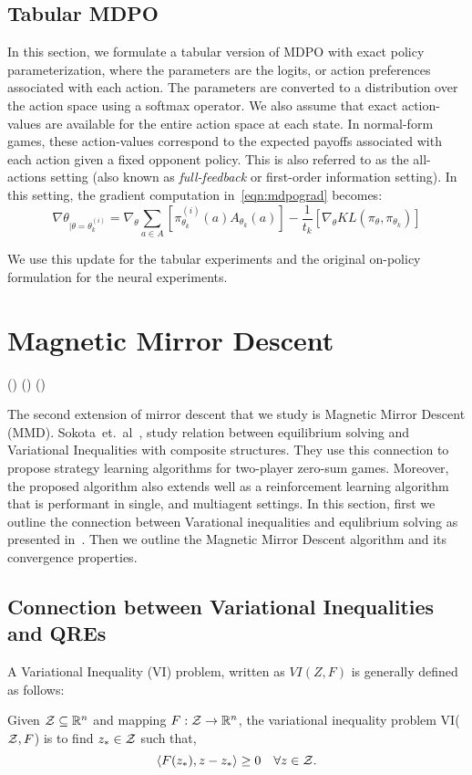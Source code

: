 \subsection{Tabular MDPO}
In this section, we formulate a tabular version of MDPO with exact policy parameterization, where
the parameters are the logits, or action preferences associated with each action.
The parameters are converted to a distribution over the action space using a softmax operator.
We also assume that exact action-values are available for the entire action space at each state.
In normal-form games, these action-values correspond to the expected payoffs associated with each
action given a fixed opponent policy.
This is also referred to as the all-actions setting (also known as \textit{full-feedback} or
first-order information setting).
In this setting, the gradient computation in~\ref{eqn:mdpograd} becomes: \[ \nabla
	\theta_{|\theta=\theta_{k}^{(i)}} = \nabla_{\theta} \sum_{a \in A} [ \pi_{\theta_k}^{(i)} (a)
		A_{\theta_k}(a)] - \frac{1}{t_k} [\nabla_\theta KL(\pi_\theta, \pi_{\theta_k})] \]

We use this update for the tabular experiments and the original on-policy
formulation for the neural experiments.

\section[MMD]{Magnetic Mirror Descent}
 ()
 ()
 ()

The second extension of mirror descent that we study is Magnetic Mirror Descent (MMD).
Sokota~et.~al~\cite{sokotaUnified2023}, study relation between equilibrium solving and Variational
Inequalities with composite structures.
They use this connection to propose strategy learning algorithms for two-player zero-sum games.
Moreover, the proposed algorithm also extends well as a reinforcement learning algorithm that is
performant in single, and multiagent settings.
In this section, first we outline the connection between Varational inequalities and equlibrium
solving as presented in~\cite{sokotaUnified2023}.
Then we outline the Magnetic Mirror Descent algorithm and its convergence properties.

\subsection{Connection between Variational Inequalities and QREs}
A Variational Inequality (VI) problem, written as $VI(Z, F)$ is generally defined as follows:
\begin{definition}
	\label{def:vi} Given $\mathcal{Z} \subseteq \mathbb{R}^n$ and mapping $F: \mathcal{Z} \rightarrow
		\mathbb{R}^n$, the variational inequality problem VI($\mathcal{Z}, F$) is to find $z_{\ast} \in \mathcal{Z}$ such that,
	\[ \langle F(z_{\ast}), z - z_{\ast} \rangle \geq 0 \quad \forall z \in \mathcal{Z}.
	\]
\end{definition}

